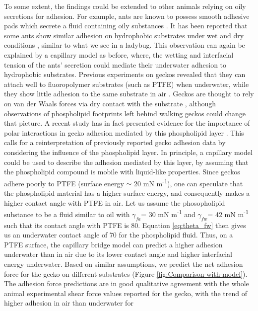 \documentclass[vruler,JEB]{COB}%
\begin{document}
To some extent, the findings could be extended to other animals relying on oily
secretions for adhesion. For example, ants are known to possess smooth adhesive pads which secrete a fluid containing oily substances \citep{RN201}.
It has been reported that some ants show similar adhesion on hydrophobic substrates under wet and dry conditions \citep{RN213},
similar to what we see in a ladybug. This observation can again be explained by a capillary model as before, where, the wetting and interfacial tension of the ants' secretion could mediate their underwater adhesion to hydrophobic substrates. Previous experiments on
geckos revealed that they can attach well to fluoropolymer substrates (such as PTFE) 
when underwater, while they show little adhesion to the same substrate in
air \citep{RN15,RN199}. Geckos are thought to rely on van der Waals
forces via dry contact with the substrate \citep{RN202}, although observations of phospholipid footprints left behind walking
geckos \citep{RN205} could change that picture. A recent study has in fact presented evidence for the importance of polar interactions in gecko adhesion mediated by this phospholipid layer \citep{RN301}. This calls for a reinterpretation of previously reported gecko adhesion data by considering the influence of the phospholipid layer. In principle, a capillary model could be used to describe the adhesion mediated by this layer, by assuming that the phospholipid compound is mobile with liquid-like properties. Since geckos adhere
poorly to PTFE (surface energy $\sim$ 20 mN m\protect\textsuperscript{-1}), one can
speculate that the phospholipid material has a higher surface energy,
and consequently makes a higher contact angle with PTFE in air. Let
us assume the phosopholipid substance to be a fluid similar to oil 
with $\gamma_{fa}$= 30 mN m\protect\textsuperscript{-1} and $\gamma_{fw}$= 42 mN m\protect\textsuperscript{-1} such that
its contact angle with PTFE is 80\textdegree . Equation \ref{eq:theta_fw}
then gives us an underwater contact angle of 70\textdegree{} for the
phospholipid fluid. Thus, on a PTFE surface, the capillary bridge
model can predict a higher adhesion underwater than in air due to
its lower contact angle and higher interfacial energy underwater.
Based on similar assumptions, we predict the net adhesion force for
the gecko on different substrates (Figure \ref{fig:Comparison-with-model}).
The adhesion force predictions are in good qualitative agreement with
the whole animal experimental shear force values reported for the
gecko, with the trend of higher adhesion in air than underwater for
\end{document}
